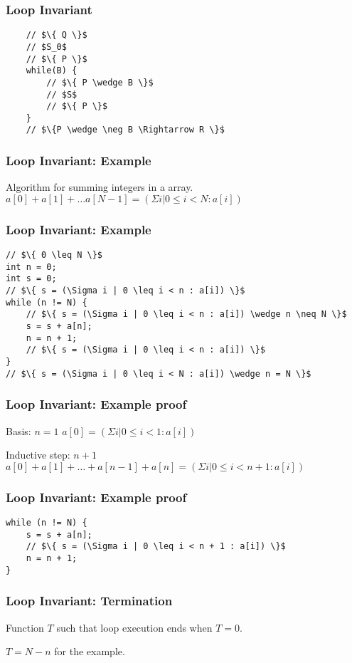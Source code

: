 \begin{frame}[fragile]
    \frametitle{Loop Invariant}
    \begin{verbatim}
    // $\{ Q \}$
    // $S_0$
    // $\{ P \}$
    while(B) {
        // $\{ P \wedge B \}$
        // $S$
        // $\{ P \}$
    }
    // $\{P \wedge \neg B \Rightarrow R \}$
    \end{verbatim}
\end{frame}

\begin{frame}
    \frametitle{Loop Invariant: Example}
    Algorithm for summing integers in a array.
    $a[0] + a[1] + \ldots a[N-1] = (\Sigma i | 0 \leq i < N : a[i])$
\end{frame}

\begin{frame}[fragile]
    \frametitle{Loop Invariant: Example}
    \begin{verbatim}
// $\{ 0 \leq N \}$
int n = 0;
int s = 0;
// $\{ s = (\Sigma i | 0 \leq i < n : a[i]) \}$
while (n != N) {
    // $\{ s = (\Sigma i | 0 \leq i < n : a[i]) \wedge n \neq N \}$
    s = s + a[n];
    n = n + 1;
    // $\{ s = (\Sigma i | 0 \leq i < n : a[i]) \}$
}
// $\{ s = (\Sigma i | 0 \leq i < N : a[i]) \wedge n = N \}$
    \end{verbatim}
\end{frame}

\begin{frame}
    \frametitle{Loop Invariant: Example proof}
    \begin{block}{Basis: $n=1$}
        $a[0] = (\Sigma i | 0 \leq i < 1 : a[i])$
    \end{block}
    \begin{block}{Inductive step: $n+1$}
        $a[0] + a[1] + \ldots + a[n-1] + a[n] = (\Sigma i | 0 \leq i < n + 1 :
        a[i])$
    \end{block}
\end{frame}

\begin{frame}[fragile]
    \frametitle{Loop Invariant: Example proof}
    \begin{verbatim}
while (n != N) {
    s = s + a[n];
    // $\{ s = (\Sigma i | 0 \leq i < n + 1 : a[i]) \}$
    n = n + 1;
}
    \end{verbatim}
\end{frame}

\begin{frame}
    \frametitle{Loop Invariant: Termination}
    Function $T$ such that loop execution ends when $T=0$.

    $T=N-n$ for the example.
\end{frame}
